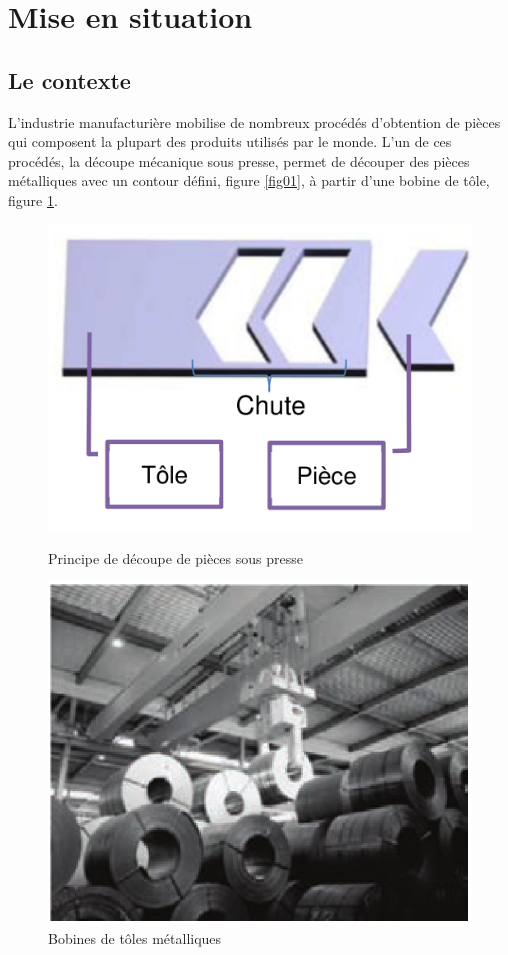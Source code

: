 

\section{Mise en situation}

\subsection{Le contexte}

L'industrie manufacturière mobilise de nombreux procédés d'obtention de pièces qui composent
la plupart des produits utilisés par le monde. L'un de ces procédés, la découpe mécanique sous
presse, permet de découper des pièces métalliques avec un contour défini, figure \ref{fig01}, à partir
d'une bobine de tôle, figure \ref{fig02}.

\begin{figure}[!h]
\begin{minipage}{0.45\linewidth}
 \centering\includegraphics[width=0.7\linewidth]{img/fig1}
 \caption{Principe de découpe de pièces sous presse}
 \label{fig01}
\end{minipage}\hfill
\begin{minipage}{0.45\linewidth}
 \centering\includegraphics[width=0.7\linewidth]{img/fig2}
 \caption{Bobines de tôles métalliques}
 \label{fig02}
\end{minipage}
\end{figure}

